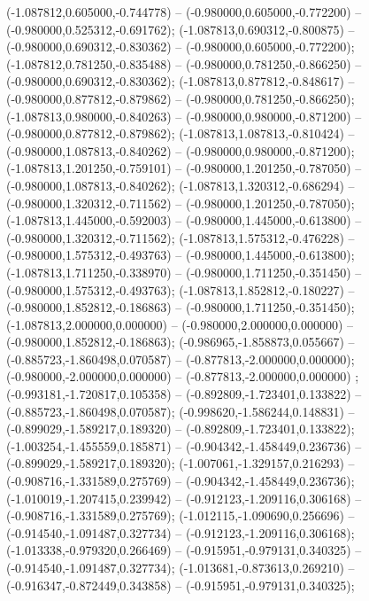  (-1.087812,0.605000,-0.744778) -- (-0.980000,0.605000,-0.772200) -- (-0.980000,0.525312,-0.691762);
 (-1.087813,0.690312,-0.800875) -- (-0.980000,0.690312,-0.830362) -- (-0.980000,0.605000,-0.772200);
 (-1.087812,0.781250,-0.835488) -- (-0.980000,0.781250,-0.866250) -- (-0.980000,0.690312,-0.830362);
 (-1.087813,0.877812,-0.848617) -- (-0.980000,0.877812,-0.879862) -- (-0.980000,0.781250,-0.866250);
 (-1.087813,0.980000,-0.840263) -- (-0.980000,0.980000,-0.871200) -- (-0.980000,0.877812,-0.879862);
 (-1.087813,1.087813,-0.810424) -- (-0.980000,1.087813,-0.840262) -- (-0.980000,0.980000,-0.871200);
 (-1.087813,1.201250,-0.759101) -- (-0.980000,1.201250,-0.787050) -- (-0.980000,1.087813,-0.840262);
 (-1.087813,1.320312,-0.686294) -- (-0.980000,1.320312,-0.711562) -- (-0.980000,1.201250,-0.787050);
 (-1.087813,1.445000,-0.592003) -- (-0.980000,1.445000,-0.613800) -- (-0.980000,1.320312,-0.711562);
 (-1.087813,1.575312,-0.476228) -- (-0.980000,1.575312,-0.493763) -- (-0.980000,1.445000,-0.613800);
 (-1.087813,1.711250,-0.338970) -- (-0.980000,1.711250,-0.351450) -- (-0.980000,1.575312,-0.493763);
 (-1.087813,1.852812,-0.180227) -- (-0.980000,1.852812,-0.186863) -- (-0.980000,1.711250,-0.351450);
 (-1.087813,2.000000,0.000000) -- (-0.980000,2.000000,0.000000) -- (-0.980000,1.852812,-0.186863);
 (-0.986965,-1.858873,0.055667) -- (-0.885723,-1.860498,0.070587) -- (-0.877813,-2.000000,0.000000);
 (-0.980000,-2.000000,0.000000) -- (-0.877813,-2.000000,0.000000) ;
 (-0.993181,-1.720817,0.105358) -- (-0.892809,-1.723401,0.133822) -- (-0.885723,-1.860498,0.070587);
 (-0.998620,-1.586244,0.148831) -- (-0.899029,-1.589217,0.189320) -- (-0.892809,-1.723401,0.133822);
 (-1.003254,-1.455559,0.185871) -- (-0.904342,-1.458449,0.236736) -- (-0.899029,-1.589217,0.189320);
 (-1.007061,-1.329157,0.216293) -- (-0.908716,-1.331589,0.275769) -- (-0.904342,-1.458449,0.236736);
 (-1.010019,-1.207415,0.239942) -- (-0.912123,-1.209116,0.306168) -- (-0.908716,-1.331589,0.275769);
 (-1.012115,-1.090690,0.256696) -- (-0.914540,-1.091487,0.327734) -- (-0.912123,-1.209116,0.306168);
 (-1.013338,-0.979320,0.266469) -- (-0.915951,-0.979131,0.340325) -- (-0.914540,-1.091487,0.327734);
 (-1.013681,-0.873613,0.269210) -- (-0.916347,-0.872449,0.343858) -- (-0.915951,-0.979131,0.340325);
